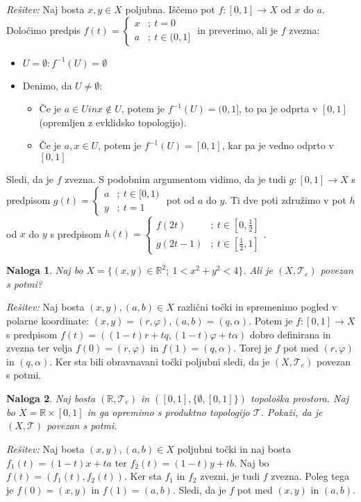 \documentclass[a4paper, 10pt]{article}
\newtheorem{nal}{Naloga}
\newenvironment{resitev}{\begin{flushleft}\textit{Rešitev:}}{\hfill\end{flushleft}}
\newcommand{\mth}[1]{\ensuremath{\mathbb{#1}}}
\newcommand{\R}{\mth{R}}
\newcommand{\map}[3]{\ensuremath{{#1}: {#2} \rightarrow {#3}}}
\begin{document}
	\begin{resitev}
		Naj bosta $x, y \in X$ poljubna. Iščemo pot $\map{f}{[0, 1]}{X}$ od $x$ do $a$. Določimo predpis $f(t) =\begin{cases}
			x &;~ t = 0 \\
			a &;~ t\in (0, 1]
		\end{cases}$ in preverimo, ali je $f$ zvezna:
		\begin{itemize}
			\item $U = \emptyset: f^{-1}(U) = \emptyset$
			\item Denimo, da $U\neq \emptyset$: \begin{itemize}
				\item Če je $a\in U in x\notin U$, potem je $f^{-1}(U) = (0, 1]$, to pa je odprta v $[0, 1]$ (opremljen z evklidsko topologijo).
				\item Če je $a, x\in U$, potem je $f^{-1}(U) = [0, 1]$, kar pa je vedno odprto v $[0, 1]$
			\end{itemize}
		\end{itemize}
		Sledi, da je $f$ zvezna. S podobnim argumentom vidimo, da je tudi \map{g}{[0, 1]}{X} s predpisom $g(t) = \begin{cases}
		a &;~ t \in [0, 1) \\
		y &;~ t = 1
		\end{cases}$ pot od $a$ do $y$. Ti dve poti združimo v pot $h$ od $x$ do $y$ s predpisom $h(t) = \begin{cases}
		f(2t) &;~ t\in [0, \frac{1}{2}] \\
		g(2t - 1) &;~ t\in [\frac{1}{2}, 1]
	\end{cases}$.
	\end{resitev}
	\begin{nal}
		Naj bo $X =\{(x, y)\in \R^2 ;~ 1 < x^2 + y^2 < 4\}$. Ali je $(X, \mathcal{T}_e)$ povezan s potmi?
	\end{nal}
	\begin{resitev}
		Naj bosta $(x, y), (a, b) \in X$ različni točki in spremenimo pogled v polarne koordinate: $(x, y) = (r, \varphi), (a, b) = (q, \alpha)$. Potem je $\map{f}{[0, 1]}{X}$ s predpisom $f(t) = ((1-t)r + tq, (1-t)\varphi + t\alpha)$ dobro definirana in zvezna ter velja $f(0) = (r, \varphi)$ in $f(1) = (q, \alpha)$. Torej je $f$ pot med $(r, \varphi)$ in $(q, \alpha)$. Ker sta bili obravnavani točki poljubni sledi, da je $(X, \mathcal{T}_e)$ povezan s potmi.
	\end{resitev}
	\begin{nal}
		Naj bosta $(\R, \mathcal{T}_e)$ in $([0, 1], \{\emptyset, [0, 1]\})$ topološka prostora. Naj bo $X = \R\times [0, 1]$ in ga opremimo s produktno topologijo $\mathcal{T}$. Pokaži, da je $(X, \mathcal{T})$ povezan s potmi.
	\end{nal}
	\begin{resitev}
		Naj bosta $(x, y), (a, b) \in X$ poljubni točki in naj bosta $f_1(t) = (1-t)x + ta$ ter $f_2(t) = (1-t)y + tb$. Naj bo $f(t) = (f_1(t), f_2(t))$. Ker sta $f_1$ in $f_2$ zvezni, je tudi $f$ zvezna. Poleg tega je $f(0) = (x, y)$ in $f(1) = (a, b)$. Sledi, da je $f$ pot med $(x, y)$ in $(a, b)$.
	\end{resitev}
\end{document}
